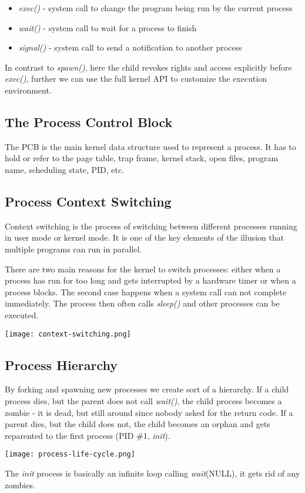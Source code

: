 \begin{itemize}
	\item \textit{exec()} - system call to change the program being run by the current process
	\item \textit{wait()} - system call to wait for a process to finish
	\item \textit{signal()} - system call to send a notification to another process
\end{itemize}

In contrast to \textit{spawn()}, here the child revokes rights and access explicitly before \textit{exec()}, further we can use the full kernel API to customize the execution environment.


\subsection{The Process Control Block}

The PCB is the main kernel data structure used to represent a process. It has to hold or refer to the page table, trap frame, kernel stack, open files, program name, scheduling state, PID, etc.


\subsection{Process Context Switching}

Context switching is the process of switching between different processes running in user mode or kernel mode. It is one of the key elements of the illusion that multiple programs can run in parallel.

There are two main reasons for the kernel to switch processes: either when a process has run for too long and gets interrupted by a hardware timer or when a process blocks. The second case happens when a system call can not complete immediately. The process then often calls \textit{sleep()} and other processes can be executed.
\begin{center}
	\texttt{[image: context-switching.png]}
\end{center}


\subsection{Process Hierarchy}

By forking and spawning new processes we create sort of a hierarchy. If a child process dies, but the parent does not call \textit{wait()}, the child process becomes a zombie - it is dead, but still around since nobody asked for the return code. If a parent dies, but the child does not, the child becomes an orphan and gets reparented to the first process (PID \#1, \textit{init}).
\begin{center}
	\texttt{[image: process-life-cycle.png]}
\end{center}

The \textit{init} process is basically an infinite loop calling \textit{wait}(NULL), it gets rid of any zombies.